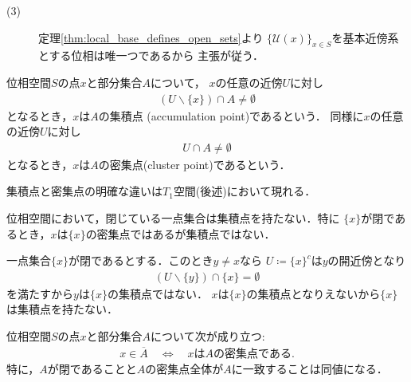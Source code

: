 \begin{prf}
\begin{description}
			\item[(3)] 
				定理\ref{thm:local_base_defines_open_sets}より
				$\{\mathscr{U}(x)\}_{x \in S}$を基本近傍系とする位相は唯一つであるから
				主張が従う．
				\QED
		\end{description}
	\end{prf}
	
	\begin{screen}
		\begin{dfn}
			位相空間$S$の点$x$と部分集合$A$について，
			$x$の任意の近傍$U$に対し
			\begin{align}
				(U \backslash \{x\}) \cap A \neq \emptyset
			\end{align}
			となるとき，$x$は$A$の集積点
			(accumulation point)であるという．
			同様に$x$の任意の近傍$U$に対し
			\begin{align}
				U \cap A \neq \emptyset
			\end{align}
			となるとき，$x$は$A$の密集点(cluster point)であるという．
		\end{dfn}
	\end{screen}
	
	集積点と密集点の明確な違いは$T_1$空間(後述)において現れる．
	\begin{screen}
		\begin{thm}[閉である一点集合は集積点を持たない]
		\label{thm:closed_singleton_has_no_accumulation_point}
			位相空間において，閉じている一点集合は集積点を持たない．特に
			$\{x\}$が閉であるとき，$x$は$\{x\}$の密集点ではあるが集積点ではない．
		\end{thm}
	\end{screen}
	
	\begin{prf}
		一点集合$\{x\}$が閉であるとする．このとき$y \neq x$なら
		$U \coloneqq \{x\}^c$は$y$の開近傍となり
		\begin{align}
			(U \backslash \{y\}) \cap \{x\} = \emptyset
		\end{align}
		を満たすから$y$は$\{x\}$の集積点ではない．
		$x$は$\{x\}$の集積点となりえないから$\{x\}$は集積点を持たない．
		\QED
	\end{prf}
	
	\begin{screen}
		\begin{thm}[閉集合は密集点集合]
		\label{thm:belongs_to_closure_iff_clusters}
			位相空間$S$の点$x$と部分集合$A$について次が成り立つ:
			\begin{align}
				x \in \overline{A} \quad \Longleftrightarrow \quad
				\mbox{$x$は$A$の密集点である}.
				\label{eq:thm_belongs_to_closure_iff_clusters}
			\end{align}
			特に，$A$が閉であることと$A$の密集点全体が$A$に一致することは同値になる．
		\end{thm}
	\end{screen}
	
